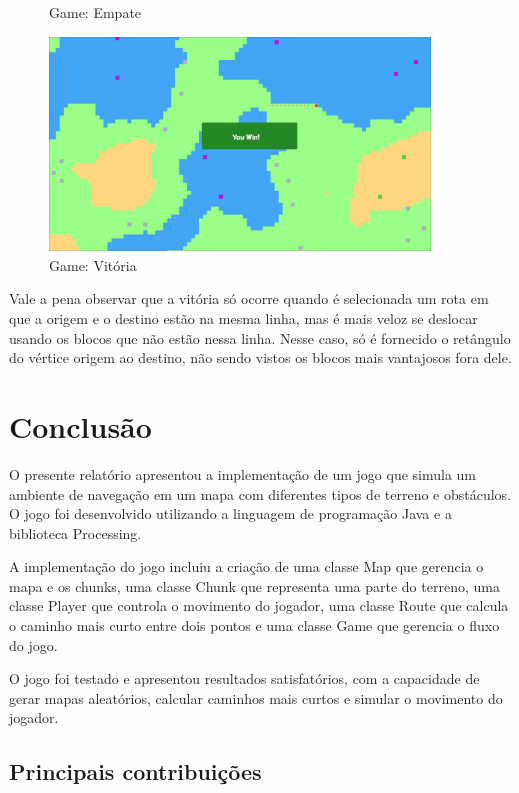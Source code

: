 \documentclass[
	12pt,				%
	oneside,			%
	a4paper,			%
	english,			%
	brazil,				%
	]{abntex2}
\begin{document}
{\begin{figure}[H]
\caption{Game: Empate}
\label{imagem 5}
\end{figure}
\begin{figure}[H]
\centering
\includegraphics[width=0.9\textwidth]{imgs/vitoria.png}
\caption{Game: Vitória}
\label{imagem 5}
\end{figure}

Vale a pena observar que a vitória só ocorre quando é selecionada um rota em que a origem e o destino estão na mesma linha, mas é mais veloz se deslocar usando os blocos que não estão nessa linha. Nesse caso, só é fornecido o retângulo do vértice origem ao destino, não sendo vistos os blocos mais vantajosos fora dele.

\section{Conclusão}

O presente relatório apresentou a implementação de um jogo que simula um ambiente de navegação em um mapa com diferentes tipos de terreno e obstáculos. O jogo foi desenvolvido utilizando a linguagem de programação Java e a biblioteca Processing.

A implementação do jogo incluiu a criação de uma classe Map que gerencia o mapa e os chunks, uma classe Chunk que representa uma parte do terreno, uma classe Player que controla o movimento do jogador, uma classe Route que calcula o caminho mais curto entre dois pontos e uma classe Game que gerencia o fluxo do jogo.

O jogo foi testado e apresentou resultados satisfatórios, com a capacidade de gerar mapas aleatórios, calcular caminhos mais curtos e simular o movimento do jogador.

\subsection{Principais contribuições}

}
\end{document}
